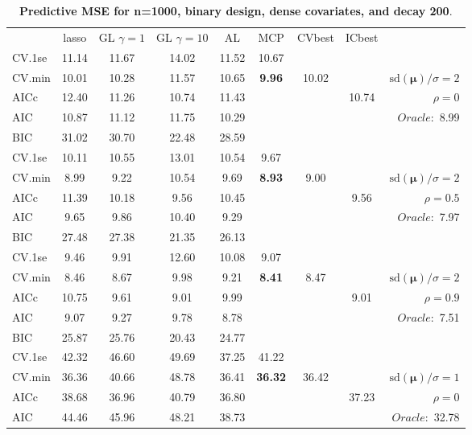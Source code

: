 \clearpage
\begin{table}\vspace{-.5cm}
\caption[l]{ { \bf Predictive MSE for n=1000, binary design, 
dense covariates, and  decay  200}.}
\vspace{-.5cm}
\footnotesize{}
\begin{center}
\begin{tabular}{l*{7}{c}|r}
 & lasso & GL $\gamma=1$ & GL $\gamma=10$ & AL & MCP  & CVbest & ICbest  \\
\cline{1-9}
CV.1se & 11.14 & 11.67 & 14.02 & 11.52 & 10.67 & & & \\
CV.min & 10.01 & 10.28 & 11.57 & 10.65 & {\bf 9.96} & 10.02 & & $\mathrm{sd}(\mathbf{\mu})/\sigma=2$ \\
AICc & 12.40 & 11.26 & 10.74 & 11.43 & & & 10.74 &  $\rho=0$ \\
AIC & 10.87 & 11.12 & 11.75 & 10.29 & & & &  \multirow{2}{*}{$Oracle: $ 8.99} \\
BIC & 31.02 & 30.70 & 22.48 & 28.59 & & & &  \\
 \hline 
CV.1se & 10.11 & 10.55 & 13.01 & 10.54 & 9.67 & & & \\
CV.min & 8.99 & 9.22 & 10.54 & 9.69 & {\bf 8.93} & 9.00 & & $\mathrm{sd}(\mathbf{\mu})/\sigma=2$ \\
AICc & 11.39 & 10.18 & 9.56 & 10.45 & & & 9.56 &  $\rho=0.5$ \\
AIC & 9.65 & 9.86 & 10.40 & 9.29 & & & &  \multirow{2}{*}{$Oracle: $ 7.97} \\
BIC & 27.48 & 27.38 & 21.35 & 26.13 & & & &  \\
 \hline 
CV.1se & 9.46 & 9.91 & 12.60 & 10.08 & 9.07 & & & \\
CV.min & 8.46 & 8.67 & 9.98 & 9.21 & {\bf 8.41} & 8.47 & & $\mathrm{sd}(\mathbf{\mu})/\sigma=2$ \\
AICc & 10.75 & 9.61 & 9.01 & 9.99 & & & 9.01 &  $\rho=0.9$ \\
AIC & 9.07 & 9.27 & 9.78 & 8.78 & & & &  \multirow{2}{*}{$Oracle: $ 7.51} \\
BIC & 25.87 & 25.76 & 20.43 & 24.77 & & & &  \\
 \hline 
CV.1se & 42.32 & 46.60 & 49.69 & 37.25 & 41.22 & & & \\
CV.min & 36.36 & 40.66 & 48.78 & 36.41 & {\bf 36.32} & 36.42 & & $\mathrm{sd}(\mathbf{\mu})/\sigma=1$ \\
AICc & 38.68 & 36.96 & 40.79 & 36.80 & & & 37.23 &  $\rho=0$ \\
AIC & 44.46 & 45.96 & 48.21 & 38.73 & & & &  \multirow{2}{*}{$Oracle: $ 32.78} \\

\end{tabular}
\end{center}
\end{table}
